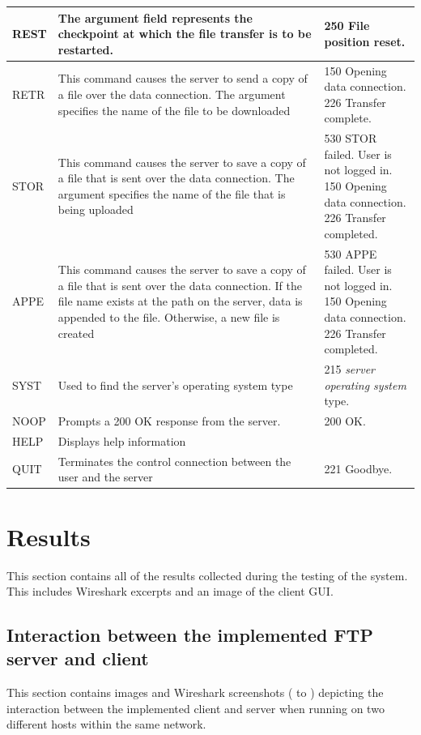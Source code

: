 \documentclass[10pt,twocolumn]{witseiepaper}
\begin{document}
\begin{appendix}
\begin{longtable}{|p{2cm}|p{7cm}|p{7cm}|}
	\hline 
REST	& The argument field represents the checkpoint at which the file transfer is to be restarted.  & 250 File position reset. \\ 
	\hline 
RETR	& This command causes the server to send a copy of a file over the data connection. The argument specifies the name of the file to be downloaded &  \makecell[l]{150 Opening data connection. \\226 Transfer complete.} \\ 
	\hline 
STOR	& This command causes the server to save a copy of a file that is sent over the data connection. The argument specifies the name of the file that is being uploaded &  \makecell[l]{530 STOR failed. User is not logged in. \\150 Opening data connection. \\226 Transfer completed.} \\ 
	\hline 
APPE	& This command causes the server to save a copy of a file that is sent over the data connection. If the file name exists at the path on the server, data is appended to the file. Otherwise, a new file is created &  \makecell[l]{530 APPE failed. User is not logged in. \\150 Opening data connection. \\226 Transfer completed.}\\ 
	\hline 
SYST	& Used to find the server's operating system type & 215 \textit{server operating system} type. \\ 
	\hline 
NOOP	& Prompts a 200 OK response from the server. & 200 OK. \\ 
	\hline 
HELP	& Displays help information &  \\ 
	\hline 
QUIT	& Terminates the control connection between the user and the server &  221 Goodbye.\\ 
	\hline 

\end{longtable}

\newpage
\setcounter{figure}{0} 
\renewcommand{\thefigure}
{C\arabic{figure}}

\section{Results}
This section contains all of the results collected during the testing of the system. This includes Wireshark excerpts and an image of the client GUI.

\subsection{Interaction between the implemented FTP server and client}\label{sec:ourserverourclient}
This section contains images and Wireshark screenshots ( to ) depicting the interaction between the implemented client and server when running on two different hosts within the same network. 


\end{appendix}
\end{document}
